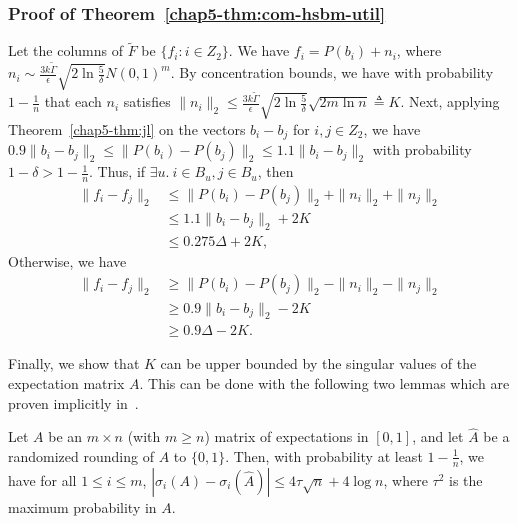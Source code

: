 \subsubsection{Proof of Theorem~\ref{chap5-thm:com-hsbm-util}}
Let the columns of $\tilde{F}$ be $\{f_i : i \in Z_2 \}$.
We have $f_i = P(b_i) + n_i$, where $n_i \sim \frac{3k \tilde{\Gamma}}{\epsilon} \sqrt{2\ln \frac{5}{\delta}}N(0,1)^{m}$. By concentration bounds, we have with probability $1-\frac{1}{n}$ that each $n_i$ satisfies $\|n_i\|_2 \leq \frac{3k\tilde{\Gamma}}{\epsilon}\sqrt{2\ln \frac{5}{\delta}} \sqrt{2m \ln n} \triangleq K$. Next, applying Theorem~\ref{chap5-thm:jl} on the vectors $b_i - b_j$ for $i,j \in Z_2$, we have $0.9 \|b_i - b_j\|_2 \leq \|P(b_i) - P(b_j)\|_2 \leq 1.1 \|b_i - b_j\|_2$ with probability $1-\delta > 1-\frac{1}{n}$. Thus, if $\exists u.~ i \in B_u, j \in B_u$, then
\begin{align*}
    \|f_i - f_j\|_2 &\leq \|P(b_i) - P(b_j)\|_2 + \|n_i\|_2 + \|n_j\|_2 \\
    &\leq 1.1 \|b_i - b_j\|_2 + 2K \\
    &\leq 0.275 \Delta + 2K,
\end{align*}
Otherwise, we have
\begin{align*}
    \|f_i - f_j\|_2 &\geq \|P(b_i) - P(b_j)\|_2 - \|n_i\|_2 - \|n_j\|_2 \\
    &\geq 0.9 \|b_i - b_j\|_2 - 2K \\
    &\geq0.9\Delta - 2K.
\end{align*}


Finally, we show that $K$ can be upper bounded by the singular values of the expectation matrix $A$. This can be done with the following two lemmas which are proven implicitly in~\citet{vu2014simple}.
\begin{lem}\label{chap5-lem:rand-mat-sv}
Let $A$ be an $m \times n$ (with $m \geq n$) matrix of expectations in $[0,1]$, and let $\hat{A}$ be a randomized rounding of $A$ to $\{0,1\}$. Then, with probability at least $1 - \frac{1}{n}$, we have for all $1 \leq i \leq m$, $|\sigma_i(A) - \sigma_i(\hat{A})| \leq 4\tau \sqrt{n} + 4 \log n$, where $\tau^2$ is the maximum probability in $A$.
\end{lem}

